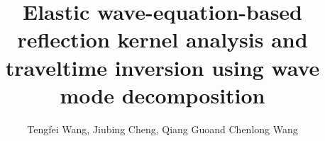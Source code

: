 \makeatletter
\newcommand{\rome}[1]{\romannumeral #1}
\newcommand{\Rome}[1]{\expandafter\@slowromancap\romannumeral #1@}
\newcommand{\bsy}[1]{\boldsymbol{{}#1}}
\makeatother
\title{Elastic wave-equation-based reflection kernel analysis and traveltime inversion using wave mode decomposition}
\author{
	Tengfei Wang\footnotemark[1], Jiubing Cheng\footnotemark[2], Qiang Guo\footnotemark[3] and Chenlong Wang\footnotemark[4] 
}
\address{
	\footnotemark[1] School of Ocean and Earth Science, Tongji University, Shanghai,
	China. E-mail: 1110701@tongji.edu.cn\\
	\footnotemark[2] State Key Laboratory of Marine Geology, Tongji University,
	Shanghai, China. E-mail: cjb1206@tongji.edu.cn\\
	\footnotemark[3] School of Ocean and Earth Science, Tongji University, Shanghai,
	China. E-mail: 1110701@tongji.edu.cn\\
	\footnotemark[4] State Key Laboratory of Marine Geology, Tongji University,
	Shanghai, China. E-mail: cjb1206@tongji.edu.cn
}
\maketitle

